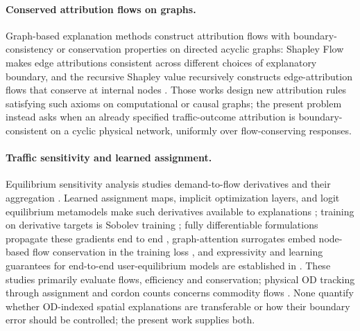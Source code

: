 \documentclass[a4paper,fleqn]{cas-sc}
\begin{document}
\paragraph{Conserved attribution flows on graphs.}
Graph-based explanation methods construct attribution flows with
boundary-consistency or conservation properties on directed acyclic
graphs: Shapley Flow makes edge attributions consistent across
different choices of explanatory boundary, and the recursive Shapley
value recursively constructs edge-attribution flows that conserve at
internal nodes \citep{wang2021shapleyflow,singal2021rsv}. Those works
design new attribution rules satisfying such axioms on computational or
causal graphs; the present problem instead asks when an already
specified traffic-outcome attribution is boundary-consistent on a
cyclic physical network, uniformly over flow-conserving responses.

\paragraph{Traffic sensitivity and learned assignment.}
Equilibrium sensitivity analysis studies demand-to-flow derivatives and
their aggregation
\citep{tobin1988sensitivity,yang2005sensitivity,josefsson2007sensitivity,patriksson2003aggregated}.
Learned assignment maps, implicit optimization layers, and logit
equilibrium metamodels make such derivatives available to explanations
\citep{liu2023endtoend,amos2017optnet,lassen2025learning}; training on
derivative targets is Sobolev training
\citep{czarnecki2017sobolev,yuan2022sobolev}; fully differentiable
formulations propagate these gradients end to end
\citep{li2026differentiable,seo2026differentiable}, graph-attention
surrogates embed node-based flow conservation in the training loss
\citep{liu2024heterogeneous,liu2025multiclass}, and expressivity and
learning guarantees for end-to-end user-equilibrium models are
established in \citet{liu2025endtoend}. These studies primarily
evaluate flows, efficiency and conservation; physical OD tracking
through assignment and cordon counts concerns commodity flows
\citep{sheffi1985urban,vanzuylen1980most,bar2002origin}. None
quantify whether OD-indexed spatial explanations are transferable or
how their boundary error should be controlled; the present work
supplies both.
\end{document}
